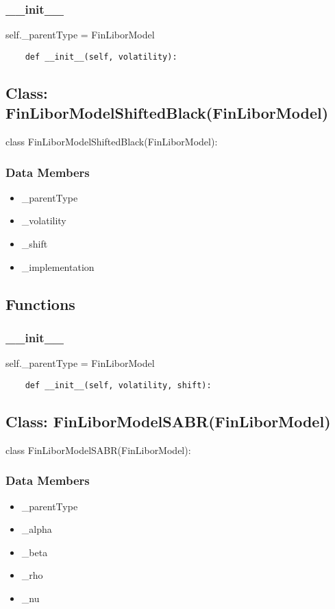 \documentclass[twoside,11pt]{book}
\begin{document}
\subsubsection*{{\bf \_\_init\_\_}}
self.\_parentType = FinLiborModel 

\begin{lstlisting}
    def __init__(self, volatility):
\end{lstlisting}

\subsection*{Class: FinLiborModelShiftedBlack(FinLiborModel)}
class FinLiborModelShiftedBlack(FinLiborModel): 

\subsubsection*{Data Members}
\begin{itemize}
\item{\_parentType}
\item{\_volatility}
\item{\_shift}
\item{\_implementation}
\end{itemize}

\subsection*{Functions}

\subsubsection*{{\bf \_\_init\_\_}}
self.\_parentType = FinLiborModel 

\begin{lstlisting}
    def __init__(self, volatility, shift):
\end{lstlisting}

\subsection*{Class: FinLiborModelSABR(FinLiborModel)}
class FinLiborModelSABR(FinLiborModel): 

\subsubsection*{Data Members}
\begin{itemize}
\item{\_parentType}
\item{\_alpha}
\item{\_beta}
\item{\_rho}
\item{\_nu}
\end{itemize}
\end{document}

